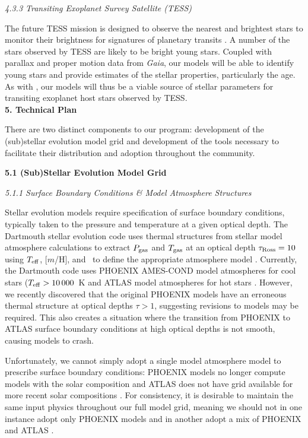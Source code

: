 {\it 4.3.3 Transiting Exoplanet Survey Satellite (TESS)}

The future TESS mission is designed to observe the nearest and brightest stars to monitor their brightness for signatures of planetary transits \citep{Ricker2014}. A number of the stars observed by TESS are likely to be bright young stars. Coupled with parallax and proper motion data from \emph{Gaia}, our models will be able to identify young stars and provide estimates of the stellar properties, particularly the age. As with \kepler, our models will thus be a viable source of stellar parameters for transiting exoplanet host stars observed by TESS. \\


{\bf\large 5. Technical Plan}  

There are two distinct components to our program: development of the (sub)stellar evolution model grid and development of the tools necessary to facilitate their distribution and adoption throughout the community. 

{\bf 5.1 (Sub)Stellar Evolution Model Grid}

{\it 5.1.1 Surface Boundary Conditions \& Model Atmosphere Structures}

Stellar evolution models require specification of surface boundary conditions, typically taken to the pressure and temperature at a given optical depth. The Dartmouth stellar evolution code uses thermal structures from stellar model atmosphere calculations to extract $P_{\rm gas}$ and $T_{\rm gas}$ at an optical depth $\tau_{\rm Ross} = 10$ using $T_{\rm eff}$, [$m$/H], and \logg\ to define the appropriate atmosphere model \citep{Feiden2016}. Currently, the Dartmouth code uses PHOENIX AMES-COND model atmospheres \citep{Hauschildt1999a} for cool stars ($T_{\rm eff} > 10\,000$~K and ATLAS model atmospheres for hot stars \citep{Castelli2004}. However, we recently discovered that the original PHOENIX models have an erroneous thermal structure at optical depths $\tau > 1$, suggesting revisions to models may be required. This also creates a situation where the transition from PHOENIX to ATLAS surface boundary conditions at high optical depths is not smooth, causing models to crash. 


Unfortunately, we cannot simply adopt a single model atmosphere model to prescribe surface boundary conditions: PHOENIX models no longer compute models with the \citet{GS98} solar composition and ATLAS does not have grid available for more recent solar compositions \citep[e.g.,][]{Asplund2009}. For consistency, it is desirable to maintain the same input physics throughout our full model grid, meaning we should not in one instance adopt only PHOENIX models \citep[for][]{Asplund2009} and in another adopt a mix of PHOENIX and ATLAS \citep[for][]{GS98}.


